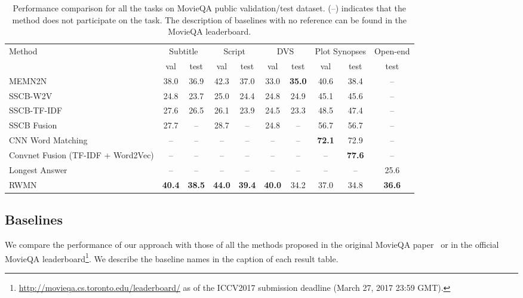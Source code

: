\documentclass[10pt,twocolumn,letterpaper]{article}
\theoremstyle{nonumberplain}
\begin{document}
\begin{table*}[t]
\begin{centering}
\small
\newcommand{\ranked}[1]{\xspace\scriptsize\sf{(#1)}}
\begin{tabular}{l|ccccccccc}
\hline
Method  & \multicolumn{2}{c}{Subtitle} & \multicolumn{2}{c}{Script} & \multicolumn{2}{c}{DVS} & \multicolumn{2}{c}{Plot Synopses} & Open-end \\
& val & test & val & test & val & test & val & test & test \\
\hline
MEMN2N~\cite{tapaswi2016movieqa} & 38.0 & 36.9 & 42.3 & 37.0 & 33.0 & \textbf{35.0} & 40.6 & 38.4 &--  \\
SSCB-W2V~\cite{tapaswi2016movieqa} & 24.8 & 23.7 & 25.0 & 24.4 & 24.8 & 24.9 & 45.1 & 45.6 & -- \\ 
SSCB-TF-IDF~\cite{tapaswi2016movieqa}  & 27.6 & 26.5 & 26.1 & 23.9 & 24.5 & 23.3 & 48.5 & 47.4 & --  \\ 
SSCB Fusion~\cite{tapaswi2016movieqa}  & 27.7 & -- & 28.7 & -- & 24.8 & -- & 56.7 & 56.7 & --\\
CNN Word Matching~\cite{wang2017compare}  & -- & -- & -- & -- & -- & -- & \textbf{72.1} & 72.9 & --\\
Convnet Fusion (TF-IDF + Word2Vec) & -- & -- & -- & -- & -- & -- & -- & \textbf{77.6} & -- \\
Longest Answer  & -- & -- & -- & -- & -- & -- & -- & -- & 25.6\\
	
\hline
{RWMN} & \textbf{40.4} & \textbf{38.5} & \textbf{44.0} & \textbf{39.4} & \textbf{40.0} & 34.2 & 37.0 & 34.8 & \textbf{36.6} \\
\hline
\end{tabular}
\vspace{6pt}
\caption{
Performance comparison for all the tasks on MovieQA public validation/test dataset.
(--) indicates that the method does not participate on the task. 
The description of baselines with no reference can be found in the MovieQA leaderboard. 
}
\label{tab:results_text}
\end{centering}
\end{table*}
\subsection{Baselines}
\label{sec:movieqa_dataset}

We compare the performance of our approach with those of all the methods proposed in the original MovieQA paper~\cite{tapaswi2016movieqa} or in the official MovieQA leaderboard\footnote{\url{http://movieqa.cs.toronto.edu/leaderboard/} as of the ICCV2017 submission deadline (March 27, 2017 23:59 GMT).}.
We describe the baseline names in the caption of each result table. 
\end{document}
